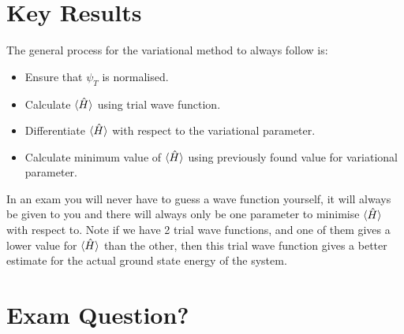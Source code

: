 \section{Key Results}

The general process for the variational method to always follow is:

\begin{itemize}
    \item Ensure that $\psi_T$ is normalised.
    \item Calculate $\braket{\Hat{H}}$ using trial wave function.
    \item Differentiate $\braket{\Hat{H}}$ with respect to the variational parameter.
    \item Calculate minimum value of $\braket{\Hat{H}}$ using previously found value for variational parameter.
\end{itemize}

\noindent In an exam you will never have to guess a wave function yourself, it will always be given to you and there will always only be one parameter to minimise $\braket{\Hat{H}}$ with respect to. Note if we have 2 trial wave functions, and one of them gives a lower value for $\braket{\Hat{H}}$ than the other, then this trial wave function gives a better estimate for the actual ground state energy of the system.

\section{Exam Question?}
